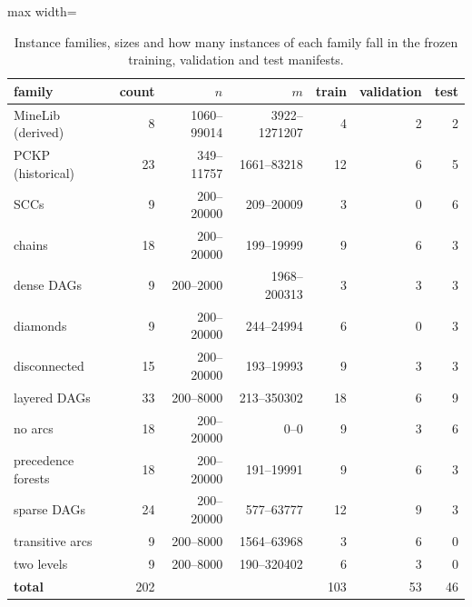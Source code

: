 \begin{table}[tbp]
\centering
\caption{Instance families, sizes and how many instances of each family fall in the frozen training, validation and test manifests.}
\label{tab:instances}
\small
\begin{adjustbox}{max width=\textwidth}
\begin{tabular}{lrrrrrr}
\toprule
family & count & $n$ & $m$ & train & validation & test \\
\midrule
MineLib (derived) & 8 & 1060--99014 & 3922--1271207 & 4 & 2 & 2 \\
PCKP (historical) & 23 & 349--11757 & 1661--83218 & 12 & 6 & 5 \\
SCCs & 9 & 200--20000 & 209--20009 & 3 & 0 & 6 \\
chains & 18 & 200--20000 & 199--19999 & 9 & 6 & 3 \\
dense DAGs & 9 & 200--2000 & 1968--200313 & 3 & 3 & 3 \\
diamonds & 9 & 200--20000 & 244--24994 & 6 & 0 & 3 \\
disconnected & 15 & 200--20000 & 193--19993 & 9 & 3 & 3 \\
layered DAGs & 33 & 200--8000 & 213--350302 & 18 & 6 & 9 \\
no arcs & 18 & 200--20000 & 0--0 & 9 & 3 & 6 \\
precedence forests & 18 & 200--20000 & 191--19991 & 9 & 6 & 3 \\
sparse DAGs & 24 & 200--20000 & 577--63777 & 12 & 9 & 3 \\
transitive arcs & 9 & 200--8000 & 1564--63968 & 3 & 6 & 0 \\
two levels & 9 & 200--8000 & 190--320402 & 6 & 3 & 0 \\
\textbf{total} & 202 &  &  & 103 & 53 & 46 \\
\bottomrule
\end{tabular}
\end{adjustbox}
\end{table}
